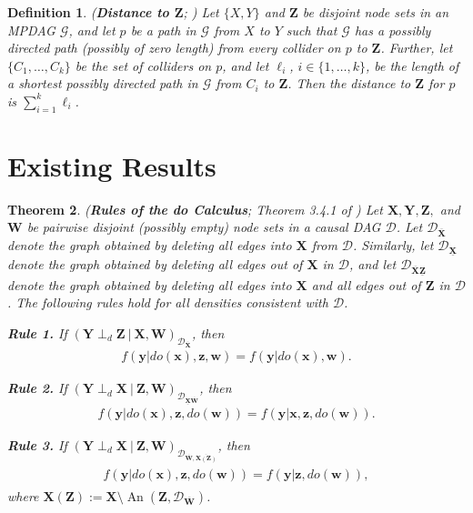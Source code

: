 \documentclass[11pt]{article}
\DeclareMathOperator{\An}{An}
\newtheorem{theorem}{Theorem}
\newtheorem{definition}[theorem]{Definition}
\newcommand\given[1][]{\:#1\vert\:}
\newcommand{\mb}[1]{\mathbf{#1}}
\newcommand{\dsepp}{\perp_{d}}
\newcommand{\g}[1][G]{\mathcal{#1}}
\begin{document}
\begin{definition}
\label{def:distance}
{\normalfont (\textbf{Distance to $\mb{Z}$}; \citealp{perkovic2017interpreting})} 
    Let $\{X,Y\}$ and $\mb{Z}$ be disjoint node sets in an MPDAG $\g$, and let $p$ be a path in $\g$ from $X$ to $Y$ such that $\g$ has a possibly directed path (possibly of zero length) from every collider on $p$ to $\mb{Z}$. Further, let $\{C_1, \dots, C_k\}$ be the set of colliders on $p$, and let $\ell_i$, $i \in \{1, \dots, k\}$, be the length of a shortest possibly directed path in $\g$ from $C_i$ to $\mb{Z}$. Then the \emph{distance to $\mb{Z}$} for $p$ is $\sum_{i=1}^k \ell_i$.
\end{definition}






\section{Existing Results}
\label{app:existing}

\begin{theorem}
\label{thm:do-calc}
{\normalfont (\textbf{Rules of the do Calculus}; Theorem 3.4.1 of \cite{pearl2009causality})}
Let $\mb{X,Y,Z,}$ and $\mb{W}$ be pairwise disjoint (possibly empty) node sets in a causal DAG $\g[D]$. Let $\g[D]_{\overline{\mb{X}}}$ denote the graph obtained by deleting all edges into $\mb{X}$ from $\g[D]$. Similarly, let $\g[D]_{\underline{\mb{X}}}$ denote the graph obtained by deleting all edges out of $\mb{X}$ in $\g[D]$, and let $\g[D]_{\overline{\mb{X}}\underline{\mb{Z}}}$ denote the graph obtained by deleting all edges into $\mb{X}$ and all edges out of $\mb{Z}$ in $\g[D]$. The following rules hold for all densities consistent with $\g[D]$.

\textbf{Rule 1.} If $(\mb{Y} \dsepp \mb{Z} \given \mb{X}, \mb{W})_{\g[D]_{\overline{\mb{X}}}}$, then
    \begin{align}
        f(\mb{y} | do(\mb{x}), \mb{z,w}) = f(\mb{y} | do(\mb{x}), \mb{w}). \label{thm:do-rule1}
    \end{align}

\textbf{Rule 2.} If $(\mb{Y} \dsepp \mb{X} \given \mb{Z}, \mb{W})_{\g[D]_{\underline{\mb{X}}\overline{\mb{W}}}}$, then
    \begin{align}
        f(\mb{y} | do(\mb{x}),\mb{z},do(\mb{w})) = f(\mb{y} | \mb{x},\mb{z},do(\mb{w})). \label{thm:do-rule2}
    \end{align}

\textbf{Rule 3.} If $(\mb{Y} \dsepp \mb{X} \given \mb{Z}, \mb{W})_{\g[D]_{\overline{\mb{W}}, \overline{\mb{X}(\mb{Z})}}}$, then
    \begin{align}
        \begin{split}
            f(\mb{y} | do(\mb{x}), \mb{z}, do(\mb{w})) = f(\mb{y} | \mb{z}, do(\mb{w})), \label{thm:do-rule3}
        \end{split}
    \end{align}
where $\mb{X(Z)} := \mb{X} \setminus \An(\mb{Z}, \g[D]_{\overline{\mb{W}}})$.
\end{theorem}
\end{document}
